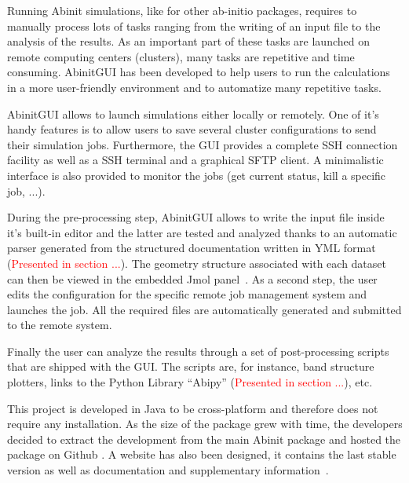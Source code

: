 Running Abinit simulations, like for other ab-initio packages, requires to 
manually process lots of tasks ranging from the writing of an input file to 
the analysis of the results. As an 
important part of these tasks are launched on remote computing centers 
(clusters), many tasks are repetitive and time consuming.
AbinitGUI has been developed to help users to run the 
calculations in a more 
user-friendly environment and to automatize many repetitive tasks.

AbinitGUI allows to launch simulations either locally 
or remotely. One of it's handy features is to allow users to save several 
cluster configurations to send their simulation jobs. Furthermore, the GUI 
provides a complete SSH connection facility as well as a SSH terminal and a 
graphical SFTP client. A minimalistic interface is also provided to monitor the 
jobs (get current status, kill a specific job, ...).


During the pre-processing step, AbinitGUI allows to write the input file inside 
it's built-in editor and the latter are tested and 
analyzed thanks to an automatic parser generated from the structured 
documentation written in YML format (\textcolor{red}{Presented in section 
...}). 
The geometry structure associated with each dataset can then be viewed in the 
embedded Jmol 
panel~\cite{Jmol}.
As a second step, the user edits the configuration for the specific remote job 
management system and launches the job. All the required files are
automatically 
generated and submitted to the remote system.

Finally the user can analyze the results through a 
set of post-processing scripts that are shipped with the GUI. The scripts are, 
for instance, band structure plotters, links to the Python Library ``Abipy'' 
(\textcolor{red}{Presented in section ...}), etc.

This project is developed in Java to be cross-platform and therefore does not 
require any installation. As the size of the package grew with time, the 
developers decided to extract the development from the main Abinit package and 
hosted the package on Github 
\cite{github-abinitgui}. A website 
has also been designed, it contains the last 
stable version as well as documentation and supplementary 
information~\cite{site-abinitgui}.